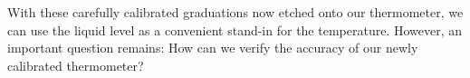 \begin{bibunit}
With these carefully calibrated graduations now etched onto our thermometer, we can use the liquid level as a convenient stand-in for the temperature. However, an important question remains: How can we verify the accuracy of our newly calibrated thermometer?

\begin{figure}[h]
\centering
\begin{tabular}{ccc}


\end{tabular}
\end{figure}
\end{bibunit}
